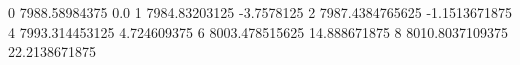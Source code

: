 0 7988.58984375 0.0
1 7984.83203125 -3.7578125
2 7987.4384765625 -1.1513671875
4 7993.314453125 4.724609375
6 8003.478515625 14.888671875
8 8010.8037109375 22.2138671875
